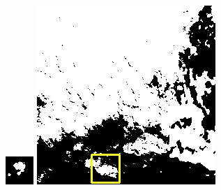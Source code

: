 \documentclass[10pt]{ctexart}
\begin{document}
\begin{multicols}{2}
\begin{figure}[H]
{\begin{minipage}[b]{0.15\linewidth}
            \includegraphics[width=1\linewidth]{../log/spoon2/cut2/tmp_cut_LC80460282014171LGN00_12434_my.jpg}\vspace{4pt}
            \includegraphics[width=1\linewidth]{../log/spoon2/cut2/LC81620432014072LGN00_16237_my.jpg}\vspace{4pt}

\end{minipage}}
\end{figure}
\end{multicols}
\end{document}
